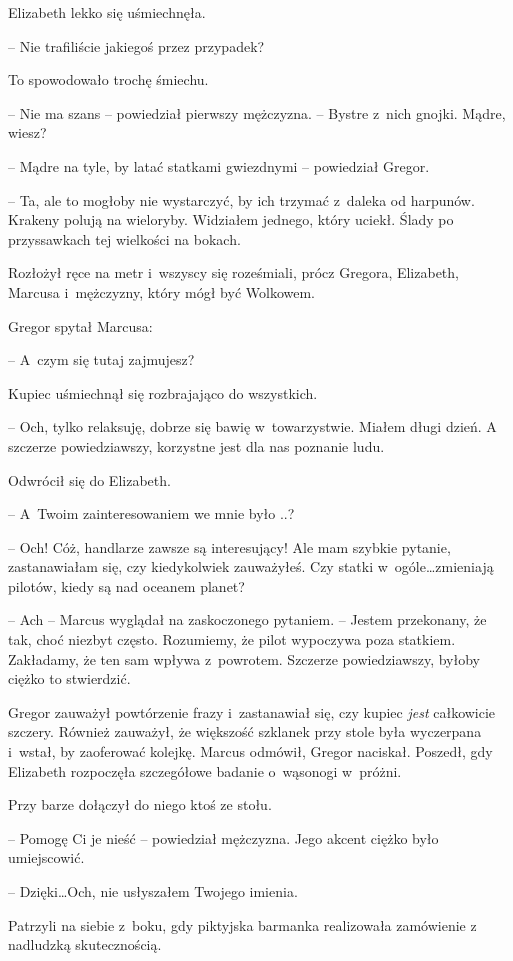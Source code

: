 \documentclass[oneside,polish,12pt,sfheadings]{mwbk}
\begin{document}
Elizabeth lekko się uśmiechnęła. 

-- Nie trafiliście jakiegoś przez
przypadek?

To spowodowało trochę śmiechu.

-- Nie ma szans -- powiedział pierwszy mężczyzna. -- Bystre z~nich gnojki.
Mądre, wiesz?

-- Mądre na tyle, by latać statkami gwiezdnymi -- powiedział Gregor.

-- Ta, ale to mogłoby nie wystarczyć, by ich trzymać z~daleka od
harpunów. Krakeny polują na wieloryby. Widziałem jednego, który uciekł.
Ślady po przyssawkach tej wielkości na bokach.

Rozłożył ręce na metr i~wszyscy się roześmiali, prócz Gregora,
Elizabeth, Marcusa i~mężczyzny, który mógł być Wolkowem.

Gregor spytał Marcusa: 

-- A~czym się tutaj zajmujesz?

Kupiec uśmiechnął się rozbrajająco do wszystkich. 

-- Och, tylko
relaksuję, dobrze się bawię w~towarzystwie. Miałem długi dzień. A
szczerze powiedziawszy, korzystne jest dla nas poznanie ludu.

Odwrócił się do Elizabeth. 

-- A~Twoim zainteresowaniem we mnie było ..?

-- Och! Cóż, handlarze zawsze są interesujący! Ale mam szybkie pytanie,
zastanawiałam się, czy kiedykolwiek zauważyłeś. Czy statki w~ogóle\ldots zmieniają pilotów, kiedy są nad oceanem planet?

-- Ach -- Marcus wyglądał na zaskoczonego pytaniem. -- Jestem przekonany,
że tak, choć niezbyt często. Rozumiemy, że pilot wypoczywa poza
statkiem. Zakładamy, że ten sam wpływa z~powrotem. Szczerze
powiedziawszy, byłoby ciężko to stwierdzić.

Gregor zauważył powtórzenie frazy i~zastanawiał się, czy kupiec
\emph{jest} całkowicie szczery. Również zauważył, że większość szklanek
przy stole była wyczerpana i~wstał, by zaoferować kolejkę. Marcus
odmówił, Gregor naciskał. Poszedł, gdy Elizabeth rozpoczęła szczegółowe
badanie o~wąsonogi w~próżni.

Przy barze dołączył do niego ktoś ze stołu.

-- Pomogę Ci je nieść -- powiedział mężczyzna. Jego akcent ciężko było
umiejscowić.

-- Dzięki\ldots Och, nie usłyszałem Twojego imienia.

Patrzyli na siebie z~boku, gdy piktyjska barmanka realizowała zamówienie
z nadludzką skutecznością.
\end{document}
